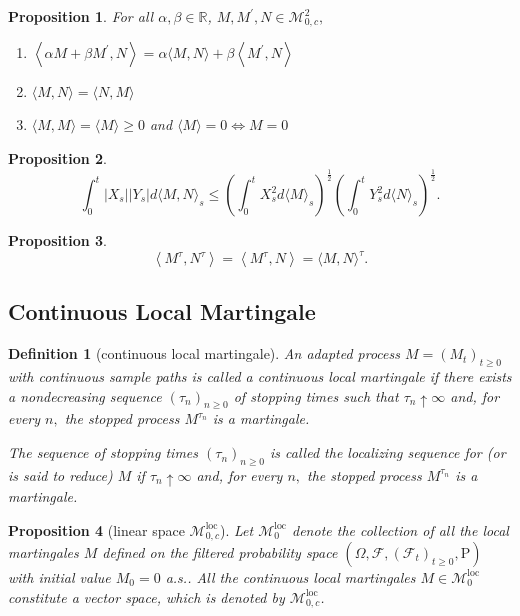 \documentclass{article}
\newtheorem{definition}{Definition}[section]
\newtheorem{proposition}{Proposition}[section]
\theoremstyle{nonumberplain}
\begin{document}
\begin{proposition}
For all $\alpha, \beta \in \mathbb{R}$, $M, M^{\prime}, N \in \mathscr{M}^2_{0,c},$

\begin{enumerate}
	\item $\left\langle\alpha M+\beta M^{\prime}, N\right\rangle=\alpha\langle M, N\rangle+\beta\left\langle M^{\prime}, N\right\rangle$
	\item$\langle M, N\rangle=\langle N, M\rangle$
	\item$\langle M, M\rangle=\langle M\rangle \geq 0$ and $\langle M\rangle= 0 \iff M=0$
\end{enumerate}
\end{proposition}

\begin{proposition}
\[
\int_{0}^{t}\left|X_{s}\right|\left|Y_{s}\right| d\langle M, N\rangle_{s} \leq\left(\int_{0}^{t} X_{s}^{2} d\langle M\rangle_{s}\right)^{\frac{1}{2}}\left(\int_{0}^{t} Y_{s}^{2} d\langle N\rangle_{s}\right)^{\frac{1}{2}}.
\]
\end{proposition}

\begin{proposition}
	\[
	\left\langle M^{\tau}, N^{\tau}\right\rangle=\left\langle M^{\tau}, N\right\rangle=\langle M, N\rangle^{\tau}.
	\]
\end{proposition}

\subsection{Continuous Local Martingale}
\begin{definition}[continuous local martingale]
	An adapted process $M=\left(M_{t}\right)_{t \geq 0}$ with continuous sample paths is called a \emph{continuous local martingale} if there exists a nondecreasing sequence $\left(\tau_{n}\right)_{n \geq 0}$ of stopping times such that $\tau_{n} \uparrow \infty$ and, for every $n,$ the stopped process $M^{\tau_{n}}$ is a martingale.
	
	The sequence of stopping times $\left(\tau_{n}\right)_{n\ge0}$ is called the \emph{localizing sequence}
	for (or is said to reduce) $M$ if $\tau_{n} \uparrow \infty$ and, for every $n,$ the stopped process $M^{\tau_{n}}$ is a martingale.
\end{definition}


\begin{proposition}[linear space $\mathscr{M}^{\mathrm{loc}}_{0,c}$]
	Let $\mathscr{M}_0^{\mathrm{loc}}$ denote the collection of all the local martingales $M$ defined on the filtered probability space $(\Omega,\mathcal{F},(\mathcal{F}_{t})_{t\ge0},\mathrm{P})$ with initial value $M_0=0$ a.s.. All the continuous local martingales $M\in\mathscr{M}^{\mathrm{loc}}_{0}$ constitute a vector space, which is denoted by $\mathscr{M}^{\mathrm{loc}}_{0,c}$.
\end{proposition}
\end{document}
